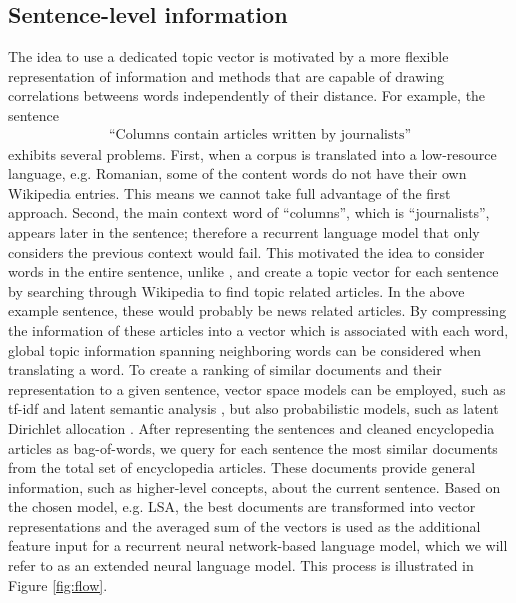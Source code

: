 \documentclass[a4paper]{article}
\begin{document}
\subsection{Sentence-level information} \label{sec:sentence-level}
The idea to use a dedicated topic vector is motivated by a more flexible representation of information and methods that are capable of drawing correlations betweens words independently of their distance.
For example, the sentence 
\begin{align}
\text{``Columns contain articles written by journalists''}
\end{align}
exhibits several problems. First, when a corpus is translated into a low-resource language, e.g. Romanian, some of the content words do not have their own Wikipedia entries. This means we cannot take full advantage of the first approach. Second, the main context word of ``columns'', which is ``journalists'', appears later in the sentence; therefore a recurrent language model that only considers the previous context would fail. 
This motivated the idea to consider words in the entire sentence, unlike \cite{mikolov2012context}, and create a topic vector for each sentence by searching through Wikipedia to find topic related articles. In the above example sentence, these would probably be news related articles. By compressing the information of these articles into a vector which is associated with each word, global topic information spanning neighboring words can be considered when translating a word. 
To create a ranking of similar documents and their representation to a given sentence, vector space models can be employed, such as tf-idf \cite{salton1986introduction} and latent semantic analysis \cite{bradford2008empirical}, but also probabilistic models, such as latent Dirichlet allocation \cite{blei2003latent}. After representing the sentences and cleaned encyclopedia articles as bag-of-words, we query for each sentence the most similar documents from the total set of encyclopedia articles. These documents provide general information, such as higher-level concepts, about the current sentence. Based on the chosen model, e.g. LSA, the best documents are transformed into vector representations and the averaged sum of the vectors is used as the additional feature input for a recurrent neural network-based language model, which we will refer to as an extended neural language model. This process is illustrated in Figure \ref{fig:flow}.
\end{document}
